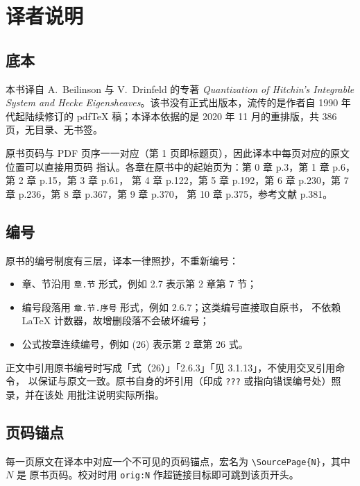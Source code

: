 \chapter*{译者说明}

\section*{底本}

本书译自 A.~Beilinson 与 V.~Drinfeld 的专著 \emph{Quantization of Hitchin's Integrable
System and Hecke Eigensheaves}。该书没有正式出版本，流传的是作者自 1990 年代起陆续修订的
pdf\TeX{} 稿；本译本依据的是 2020 年 11 月的重排版，共 386 页，无目录、无书签。

原书页码与 PDF 页序一一对应（第 1 页即标题页），因此译本中每页对应的原文位置可以直接用页码
指认。各章在原书中的起始页为：第 0 章 p.3，第 1 章 p.6，第 2 章 p.15，第 3 章 p.61，
第 4 章 p.122，第 5 章 p.192，第 6 章 p.230，第 7 章 p.236，第 8 章 p.367，第 9 章 p.370，
第 10 章 p.375，参考文献 p.381。

\section*{编号}

原书的编号制度有三层，译本一律照抄，不重新编号：

\begin{itemize}
  \item 章、节沿用 \texttt{章.节} 形式，例如 2.7 表示第 2 章第 7 节；
  \item 编号段落用 \texttt{章.节.序号} 形式，例如 2.6.7；这类编号直接取自原书，
        不依赖 \LaTeX{} 计数器，故增删段落不会破坏编号；
  \item 公式按章连续编号，例如 (26) 表示第 2 章第 26 式。
\end{itemize}

正文中引用原书编号时写成「式（26）」「2.6.3」「见 3.1.13」，不使用交叉引用命令，
以保证与原文一致。原书自身的坏引用（印成 \texttt{???} 或指向错误编号处）照录，并在该处
用批注说明实际所指。

\section*{页码锚点}

每一页原文在译本中对应一个不可见的页码锚点，宏名为 \verb|\SourcePage{N}|，其中 $N$ 是
原书页码。校对时用 \texttt{orig:N} 作超链接目标即可跳到该页开头。

